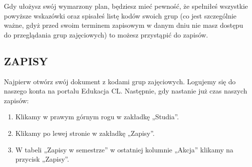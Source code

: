 \documentclass[11pt]{article}
\begin{document}

\vspace{0.1cm}

\indent \hspace{0.5cm} Gdy ułożysz swój wymarzony plan, będziesz mieć pewność, że spełniłeś wszystkie powyższe wskazówki oraz spisałeś listę kodów swoich grup (co jest szczególnie ważne, gdyż przed swoim terminem zapisowym w danym dniu nie masz dostępu do przeglądania grup zajęciowych) to możesz przystąpić do zapisów.

\subsection{ZAPISY}
\indent \hspace{0.5cm} Najpierw otwórz swój dokument z kodami grup zajęciowych. Logujemy się do naszego konta na portalu Edukacja CL. Następnie, gdy nastanie już czas naszych zapisów:
\begin{enumerate}
    \item Klikamy w prawym górnym rogu w zakładkę „Studia”.
    \item Klikamy po lewej stronie w zakładkę „Zapisy”.
    \item W tabeli „Zapisy w semestrze” w ostatniej kolumnie „Akcja” klikamy na przycisk „Zapisy”.
\end{enumerate}

\end{document}
